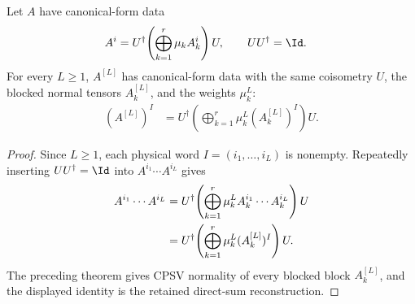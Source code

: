 \begin{lemma}
    \label{thm:cpsv_literal_canonical_form_positive_blocking}
    \leanok
    Let $A$ have canonical-form data
    \begin{align}
        A^i
         & =U^\dagger\!\left(\bigoplus_{k=1}^r\mu_kA_k^i\right)U,
        \qquad
        UU^\dagger=\Id.
        \notag
    \end{align}
    For every $L\geq1$, $A^{[L]}$ has canonical-form data with the same
    coisometry $U$, the blocked normal tensors $A_k^{[L]}$, and the weights
    $\mu_k^L$:
    \begin{align}
        (A^{[L]})^I
         & =U^\dagger\!\left(\bigoplus_{k=1}^r
        \mu_k^L(A_k^{[L]})^I\right)U.
        \label{eq:cpsv_literal_blocking_cf}
    \end{align}
\end{lemma}

\begin{proof}\leanok
    Since $L\geq1$, each physical word $I=(i_1,\ldots,i_L)$ is nonempty.
    Repeatedly inserting $UU^\dagger=\Id$ into
    $A^{i_1}\cdots A^{i_L}$ gives
    \begin{align}
        A^{i_1}\cdots A^{i_L}
         & =
        U^\dagger\!\left(\bigoplus_{k=1}^r
        \mu_k^L A_k^{i_1}\cdots A_k^{i_L}\right)U
        \notag \\
         & =
        U^\dagger\!\left(\bigoplus_{k=1}^r
        \mu_k^L(A_k^{[L]})^I\right)U.
        \notag
    \end{align}
    The preceding theorem gives CPSV normality of every blocked block
    $A_k^{[L]}$, and the displayed identity is the retained direct-sum
    reconstruction.
\end{proof}

